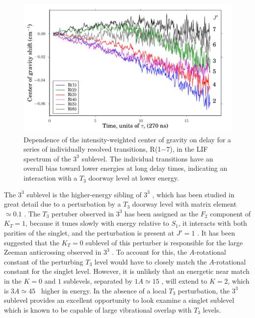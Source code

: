 \documentclass[12pt]{mitthesis}
\begin{document}
\begin{figure}
  \caption{Dependence of the intensity-weighted center of gravity on
    delay for a series of individually resolved transitions, R(1$-$7),
    in the LIF spectrum of the $3^3$  sublevel.  The individual
    transitions have an overall bias toward lower energies at long
    delay times, indicating an interaction with a $T_3$ doorway level
    at lower energy.}
  \label{fig:33k2-cog-delay}
  \centering
  \includegraphics[width=6in]{33k2-r123456-cog-delay.pdf}
\end{figure}


The $3^3$  sublevel is the higher-energy sibling of $3^3$
, which has been studied in great detail due to a
perturbation by a $T_3$ doorway level with matrix element $\simeq
0.1$ \rcm.  The $T_3$ pertuber observed in $3^3$  has been
assigned as the $F_2$ component of $K_T=1$, because 
it tunes slowly with energy relative to $S_1$,
it interacts with both parities of the singlet, and
the perturbation is present at $J'=1$
\cite{mishra04}.  It has been suggested that the $K_T=0$ sublevel of
this perturber is responsible for the large Zeeman anticrossing
observed in $3^3$  \cite{thom07, dupre93}.  To account for this,
the $A$-rotational constant of the perturbing $T_3$ level would have
to closely match the $A$-rotational constant for the singlet level.  However, it is
unlikely that an energetic near match in the $K=0$ and $1$
sublevels, separated by $1A \simeq 15$ \rcm, will extend to $K=2$,
which is $3A \simeq 45$ \rcm\ higher in energy.  In the absence of a
local $T_3$ perturbation, the $3^3$  sublevel provides an
excellent opportunity to look examine a singlet sublevel which is
known to be capable of large vibrational overlap with $T_3$ levels.
\end{document}
